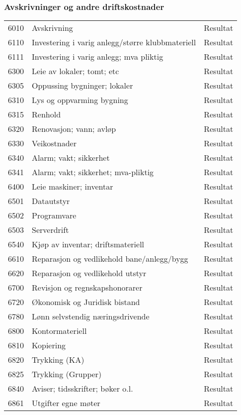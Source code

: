 \subsubsection*{Avskrivninger og andre driftskostnader}
\begin{table}[H]
	\begin{tabular}{l l l }
6010 & Avskrivning & Resultat\\
6110 & Investering i varig anlegg/større klubbmateriell & Resultat\\
6111 & Investering i varig anlegg; mva pliktig & Resultat\\
6300 & Leie av lokaler; tomt; etc & Resultat\\
6305 & Oppussing bygninger; lokaler & Resultat\\
6310 & Lys og oppvarming bygning & Resultat\\
6315 & Renhold & Resultat\\
6320 & Renovasjon; vann; avløp & Resultat\\
6330 & Veikostnader & Resultat\\
6340 & Alarm; vakt; sikkerhet & Resultat\\
6341 & Alarm; vakt; sikkerhet; mva-pliktig & Resultat\\
6400 & Leie maskiner; inventar & Resultat\\
6501 & Datautstyr & Resultat\\
6502 & Programvare & Resultat\\
6503 & Serverdrift & Resultat\\
6540 & Kjøp av inventar; driftsmateriell & Resultat\\
6610 & Reparasjon og vedlikehold bane/anlegg/bygg & Resultat\\
6620 & Reparasjon og vedlikehold utstyr & Resultat\\
6700 & Revisjon og regnskapshonorarer & Resultat\\
6720 & Økonomisk og Juridisk bistand & Resultat\\
6780 & Lønn selvstendig næringsdrivende & Resultat\\
6800 & Kontormateriell & Resultat\\
6810 & Kopiering & Resultat\\
6820 & Trykking (KA) & Resultat\\
6825 & Trykking (Grupper) & Resultat\\
6840 & Aviser; tidsskrifter; bøker o.l. & Resultat\\
6861 & Utgifter egne møter & Resultat\\

\end{tabular}
\end{table}

